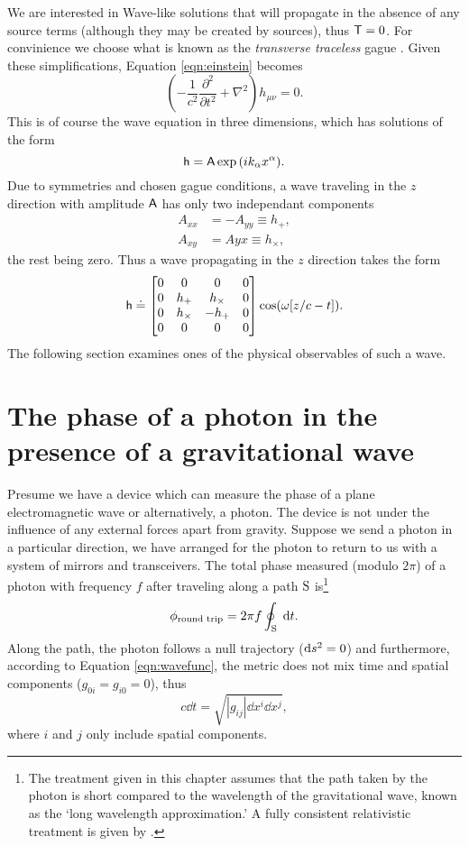 We are interested in Wave-like solutions that will propagate in the absence of any source terms (although they may be created by sources), thus $\mathsf{T}=0$. %
For convinience we choose what is known as the \emph{transverse traceless} gague . %
Given these simplifications, Equation \ref{eqn:einstein} becomes
\begin{equation}
\left(-\frac{1}{c^2}\frac{\partial^2}{\partial t^2}+\nabla^2\right)h_{\mu \nu}=0.
\end{equation}
This is of course the wave equation in three dimensions, which has solutions of the form
\begin{equation}
\mathsf{h}=\mathsf{A}\exp{(ik_\alpha x^\alpha)}.
\end{equation}
Due to symmetries and chosen gague conditions, a wave traveling in the $z$ direction with amplitude $\mathsf{A}$ has only two independant components
\begin{align*}
A_{xx}&=-A_{yy}\equiv h_+,\\
A_{xy}&=A{yx}\equiv h_\times,
\end{align*}
the rest being zero. %
Thus a wave propagating in the $z$ direction takes the form
\begin{equation}
\label{eqn:wavefunc}
\mathsf{h} \doteq 
\left[\begin{matrix}
0 & 0 & 0 & 0 \\
0 & h_+ & h_\times & 0 \\
0 & h_\times & -h_+ & 0 \\
0 & 0 & 0 & 0
\end{matrix}\right]
\cos(\omega [z/c- t]).
\end{equation}
The following section examines ones of the physical observables of such a wave.

\section{The phase of a photon in the presence of a gravitational wave}
Presume we have a device which can measure the phase of a plane electromagnetic wave or alternatively, a photon. %
The device is not under the influence of any external forces apart from gravity. %
Suppose we send a photon in a particular direction, we have arranged for the photon to return to us with a system of mirrors and transceivers. %
The total phase measured (modulo $2\pi$) of a photon with frequency $f$ after traveling along a path $\rm S$ is\footnote{The treatment given in this chapter assumes that the path taken by the photon is short compared to the wavelength of the gravitational wave, known as the `long wavelength approximation.' A fully consistent relativistic treatment is given by \citet{RakhmanovPhoton}.}
\begin{equation}
\phi_{\text{round trip}} = 2\pi f\oint_{\rm S} \; \mathrm{d} t.
\end{equation}
Along the path, the photon follows a null trajectory ($\mathrm{d} s^2=0$) and furthermore, according to Equation \ref{eqn:wavefunc}, the metric does not mix time and spatial components ($g_{0i}=g_{i0}=0$), thus
\begin{equation}
c\dd t = \sqrt{|g_{ij}|\dd x^i \dd x^j},
\end{equation}
where $i$ and $j$ only include spatial components.

